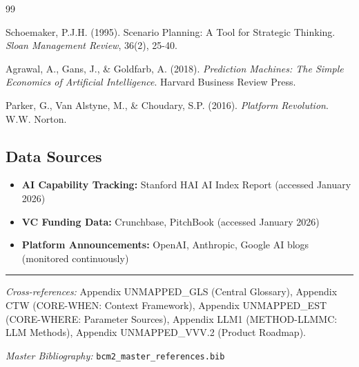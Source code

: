 \begin{thebibliography}{99}

 Schoemaker, P.J.H. (1995). Scenario Planning: A Tool for Strategic Thinking. \textit{Sloan Management Review}, 36(2), 25-40.

 Agrawal, A., Gans, J., \& Goldfarb, A. (2018). \textit{Prediction Machines: The Simple Economics of Artificial Intelligence}. Harvard Business Review Press.

 Parker, G., Van Alstyne, M., \& Choudary, S.P. (2016). \textit{Platform Revolution}. W.W. Norton.

\end{thebibliography}

\subsection{Data Sources}

\begin{itemize}[nosep]
    \item \textbf{AI Capability Tracking:} Stanford HAI AI Index Report (accessed January 2026)
    \item \textbf{VC Funding Data:} Crunchbase, PitchBook (accessed January 2026)
    \item \textbf{Platform Announcements:} OpenAI, Anthropic, Google AI blogs (monitored continuously)
\end{itemize}



\vspace{1em}
\hrule
\vspace{0.5em}

\noindent\textit{Cross-references:}
Appendix UNMAPPED_GLS (Central Glossary),
Appendix CTW (CORE-WHEN: Context Framework),
Appendix UNMAPPED_EST (CORE-WHERE: Parameter Sources),
Appendix LLM1 (METHOD-LLMMC: LLM Methods),
Appendix UNMAPPED_VVV.2 (Product Roadmap).

\noindent\textit{Master Bibliography:} \texttt{bcm2\_master\_references.bib}



